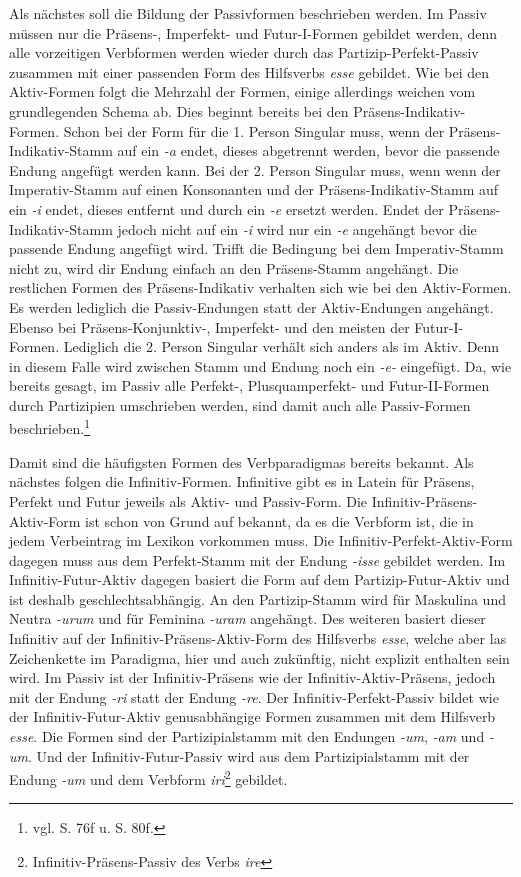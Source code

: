 \documentclass[fontsize=12pt,abstract=on,titlepage,bibliography=totoc,ngerman,listof=totoc]{scrreprt}
\begin{document}
Als nächstes soll die Bildung der Passivformen beschrieben werden. Im Passiv müssen nur die Präsens-, Imperfekt- und Futur-I-Formen gebildet werden, denn alle vorzeitigen Verbformen werden wieder durch das Partizip-Perfekt-Passiv zusammen mit einer passenden Form des Hilfsverbs \textit{esse} gebildet. Wie bei den Aktiv-Formen folgt die Mehrzahl der Formen, einige allerdings weichen vom grundlegenden Schema ab. Dies beginnt bereits bei den Präsens-Indikativ-Formen. Schon bei der Form für die 1. Person Singular muss, wenn der Präsens-Indikativ-Stamm auf ein \textit{-a} endet, dieses abgetrennt werden, bevor die passende Endung angefügt werden kann. Bei der 2. Person Singular muss, wenn wenn der Imperativ-Stamm auf einen Konsonanten und der Präsens-Indikativ-Stamm auf ein \textit{-i} endet, dieses entfernt und durch ein \textit{-e} ersetzt werden. Endet der Präsens-Indikativ-Stamm jedoch nicht auf ein \textit{-i} wird nur ein \textit{-e} angehängt bevor die passende Endung angefügt wird. Trifft die Bedingung bei dem Imperativ-Stamm nicht zu, wird dir Endung einfach an den Präsens-Stamm angehängt. Die restlichen Formen des Präsens-Indikativ verhalten sich wie bei den Aktiv-Formen. Es werden lediglich die Passiv-Endungen statt der Aktiv-Endungen angehängt. Ebenso bei Präsens-Konjunktiv-, Imperfekt- und den meisten der Futur-I-Formen. Lediglich die 2. Person Singular verhält sich anders als im Aktiv. Denn in diesem Falle wird zwischen Stamm und Endung noch ein \textit{-e-} eingefügt. Da, wie bereits gesagt, im Passiv alle Perfekt-, Plusquamperfekt- und Futur-II-Formen durch Partizipien umschrieben werden, sind damit auch alle Passiv-Formen beschrieben.\footnote{vgl. \cite{BAYER-LINDAUER1994} S. 76f u. S. 80f.} \par
Damit sind die häufigsten Formen des Verbparadigmas bereits bekannt. Als nächstes folgen die Infinitiv-Formen. Infinitive gibt es in Latein für Präsens, Perfekt und Futur jeweils als Aktiv- und Passiv-Form. Die Infinitiv-Präsens-Aktiv-Form ist schon von Grund auf bekannt, da es die Verbform ist, die in jedem Verbeintrag im Lexikon vorkommen muss. Die Infinitiv-Perfekt-Aktiv-Form dagegen muss aus dem Perfekt-Stamm mit der Endung \textit{-isse} gebildet werden. Im Infinitiv-Futur-Aktiv dagegen basiert die Form auf dem Partizip-Futur-Aktiv und ist deshalb geschlechtsabhängig. An den Partizip-Stamm wird für Maskulina und Neutra \textit{-urum} und für Feminina \textit{-uram} angehängt. Des weiteren basiert dieser Infinitiv auf der Infinitiv-Präsens-Aktiv-Form des Hilfsverbs \textit{esse}, welche aber las Zeichenkette im Paradigma, hier und auch zukünftig, nicht explizit enthalten sein wird. Im Passiv ist der Infinitiv-Präsens wie der Infinitiv-Aktiv-Präsens, jedoch mit der Endung \textit{-ri} statt der Endung \textit{-re}. Der Infinitiv-Perfekt-Passiv bildet wie der Infinitiv-Futur-Aktiv genusabhängige Formen zusammen mit dem Hilfsverb \textit{esse}. Die Formen sind der Partizipialstamm mit den Endungen \textit{-um}, \textit{-am} und \textit{-um}. Und der Infinitiv-Futur-Passiv wird aus dem Partizipialstamm mit der Endung \textit{-um} und dem Verbform \textit{iri}\footnote{Infinitiv-Präsens-Passiv des Verbs \textit{ire}} gebildet.\par
\end{document}
